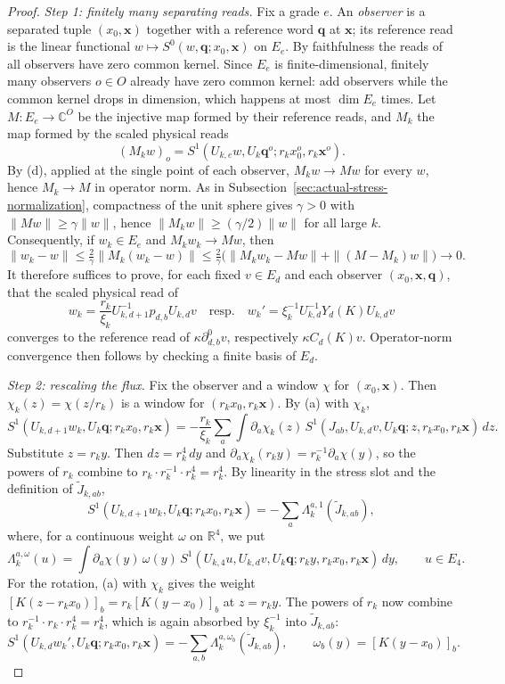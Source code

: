 \begin{proof}
\emph{Step 1: finitely many separating reads.}  Fix a grade $e$.  An
\emph{observer} is a separated tuple $(x_0,\boldsymbol x)$ together with a
reference word $\boldsymbol q$ at $\boldsymbol x$; its reference read is
the linear functional $w\mapsto S^0(w,\boldsymbol q;x_0,\boldsymbol x)$ on
$E_e$.  By faithfulness the reads of all observers have zero common kernel.
Since $E_e$ is finite-dimensional, finitely many observers $o\in O$
already have zero common kernel: add observers while the common kernel
drops in dimension, which happens at most $\dim E_e$ times.  Let
$M:E_e\to\mathbb C^O$ be the injective map formed by their reference
reads, and $M_k$ the map formed by the scaled physical reads
\[
 (M_kw)_o=S^1(U_{k,e}w,U_k\boldsymbol q^o;r_kx_0^o,r_k\boldsymbol x^o).
\]
By (d), applied at the single point of each observer, $M_kw\to Mw$ for
every $w$, hence $M_k\to M$ in operator norm.  As in
Subsection~\ref{sec:actual-stress-normalization}, compactness of the unit
sphere gives $\gamma>0$ with $\|Mw\|\ge\gamma\|w\|$, hence
$\|M_kw\|\ge(\gamma/2)\|w\|$ for all large $k$.  Consequently, if
$w_k\in E_e$ and $M_kw_k\to Mw$, then
\[
 \|w_k-w\|\le\tfrac2\gamma\|M_k(w_k-w)\|
 \le\tfrac2\gamma\bigl(\|M_kw_k-Mw\|+\|(M-M_k)w\|\bigr)\to0.
\]
It therefore suffices to prove, for each fixed $v\in E_d$ and each
observer $(x_0,\boldsymbol x,\boldsymbol q)$, that the scaled physical read
of
\[
 w_k=\frac{r_k}{\xi_k}U_{k,d+1}^{-1}p_{d,b}U_{k,d}v
 \quad\text{resp.}\quad
 w_k'=\xi_k^{-1}U_{k,d}^{-1}Y_d(K)U_{k,d}v
\]
converges to the reference read of $\kappa\partial^0_{d,b}v$, respectively
$\kappa C_d(K)v$.  Operator-norm convergence then follows by checking a
finite basis of $E_d$.

\emph{Step 2: rescaling the flux.}  Fix the observer and a window $\chi$
for $(x_0,\boldsymbol x)$.  Then $\chi_k(z)=\chi(z/r_k)$ is a window for
$(r_kx_0,r_k\boldsymbol x)$.  By (a) with $\chi_k$,
\[
 S^1(U_{k,d+1}w_k,U_k\boldsymbol q;r_kx_0,r_k\boldsymbol x)
 =-\frac{r_k}{\xi_k}\sum_a\int\partial_a\chi_k(z)\,
   S^1(J_{ab},U_{k,d}v,U_k\boldsymbol q;z,r_kx_0,r_k\boldsymbol x)\,dz.
\]
Substitute $z=r_ky$.  Then $dz=r_k^4\,dy$ and
$\partial_a\chi_k(r_ky)=r_k^{-1}\partial_a\chi(y)$, so the powers of $r_k$
combine to $r_k\cdot r_k^{-1}\cdot r_k^4=r_k^4$.  By linearity in the
stress slot and the definition of $\widetilde J_{k,ab}$,
\[
 S^1(U_{k,d+1}w_k,U_k\boldsymbol q;r_kx_0,r_k\boldsymbol x)
 =-\sum_a\Lambda^{a,1}_k(\widetilde J_{k,ab}),
\]
where, for a continuous weight $\omega$ on $\mathbb R^4$, we put
\[
 \Lambda^{a,\omega}_k(u)=\int\partial_a\chi(y)\,\omega(y)\,
   S^1(U_{k,4}u,U_{k,d}v,U_k\boldsymbol q;
       r_ky,r_kx_0,r_k\boldsymbol x)\,dy,
 \qquad u\in E_4.
\]
For the rotation, (a) with $\chi_k$ gives the weight
$[K(z-r_kx_0)]_b=r_k[K(y-x_0)]_b$ at $z=r_ky$.  The powers of $r_k$ now
combine to $r_k^{-1}\cdot r_k\cdot r_k^4=r_k^4$, which is again absorbed
by $\xi_k^{-1}$ into $\widetilde J_{k,ab}$:
\[
 S^1(U_{k,d}w_k',U_k\boldsymbol q;r_kx_0,r_k\boldsymbol x)
 =-\sum_{a,b}\Lambda^{a,\omega_b}_k(\widetilde J_{k,ab}),
 \qquad\omega_b(y)=[K(y-x_0)]_b.
\]


\end{proof}
